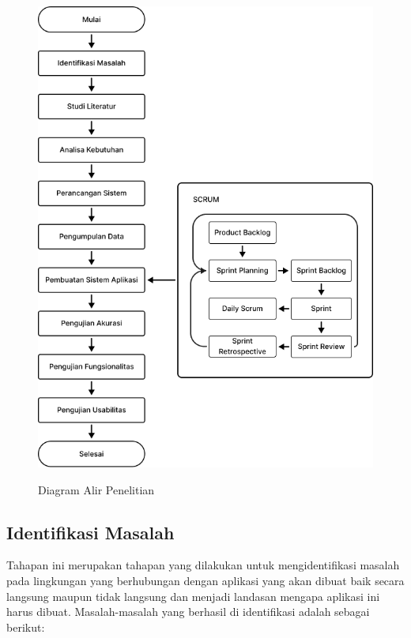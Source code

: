 \begin{figure}[H]
\centering
{\includegraphics [scale= 0.7]{gambar/bab3/diagram_alir}}
\caption{Diagram Alir Penelitian}
\label{img:diagram_alir_penelitian}
\end{figure}

\fancyhf{} 
\fancyfoot[R]{\thepage}

\subsection{Identifikasi Masalah}
Tahapan ini merupakan tahapan yang dilakukan untuk mengidentifikasi masalah pada lingkungan yang berhubungan dengan aplikasi yang akan dibuat baik secara langsung maupun tidak langsung dan menjadi landasan mengapa aplikasi ini harus dibuat. Masalah-masalah yang berhasil di identifikasi adalah sebagai berikut:

